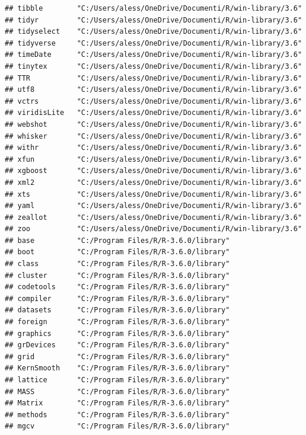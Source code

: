 \documentclass[]{article}
\begin{document}
\begin{verbatim}
## tibble        "C:/Users/aless/OneDrive/Documenti/R/win-library/3.6"
## tidyr         "C:/Users/aless/OneDrive/Documenti/R/win-library/3.6"
## tidyselect    "C:/Users/aless/OneDrive/Documenti/R/win-library/3.6"
## tidyverse     "C:/Users/aless/OneDrive/Documenti/R/win-library/3.6"
## timeDate      "C:/Users/aless/OneDrive/Documenti/R/win-library/3.6"
## tinytex       "C:/Users/aless/OneDrive/Documenti/R/win-library/3.6"
## TTR           "C:/Users/aless/OneDrive/Documenti/R/win-library/3.6"
## utf8          "C:/Users/aless/OneDrive/Documenti/R/win-library/3.6"
## vctrs         "C:/Users/aless/OneDrive/Documenti/R/win-library/3.6"
## viridisLite   "C:/Users/aless/OneDrive/Documenti/R/win-library/3.6"
## webshot       "C:/Users/aless/OneDrive/Documenti/R/win-library/3.6"
## whisker       "C:/Users/aless/OneDrive/Documenti/R/win-library/3.6"
## withr         "C:/Users/aless/OneDrive/Documenti/R/win-library/3.6"
## xfun          "C:/Users/aless/OneDrive/Documenti/R/win-library/3.6"
## xgboost       "C:/Users/aless/OneDrive/Documenti/R/win-library/3.6"
## xml2          "C:/Users/aless/OneDrive/Documenti/R/win-library/3.6"
## xts           "C:/Users/aless/OneDrive/Documenti/R/win-library/3.6"
## yaml          "C:/Users/aless/OneDrive/Documenti/R/win-library/3.6"
## zeallot       "C:/Users/aless/OneDrive/Documenti/R/win-library/3.6"
## zoo           "C:/Users/aless/OneDrive/Documenti/R/win-library/3.6"
## base          "C:/Program Files/R/R-3.6.0/library"                 
## boot          "C:/Program Files/R/R-3.6.0/library"                 
## class         "C:/Program Files/R/R-3.6.0/library"                 
## cluster       "C:/Program Files/R/R-3.6.0/library"                 
## codetools     "C:/Program Files/R/R-3.6.0/library"                 
## compiler      "C:/Program Files/R/R-3.6.0/library"                 
## datasets      "C:/Program Files/R/R-3.6.0/library"                 
## foreign       "C:/Program Files/R/R-3.6.0/library"                 
## graphics      "C:/Program Files/R/R-3.6.0/library"                 
## grDevices     "C:/Program Files/R/R-3.6.0/library"                 
## grid          "C:/Program Files/R/R-3.6.0/library"                 
## KernSmooth    "C:/Program Files/R/R-3.6.0/library"                 
## lattice       "C:/Program Files/R/R-3.6.0/library"                 
## MASS          "C:/Program Files/R/R-3.6.0/library"                 
## Matrix        "C:/Program Files/R/R-3.6.0/library"                 
## methods       "C:/Program Files/R/R-3.6.0/library"                 
## mgcv          "C:/Program Files/R/R-3.6.0/library"                 

\end{verbatim}
\end{document}
